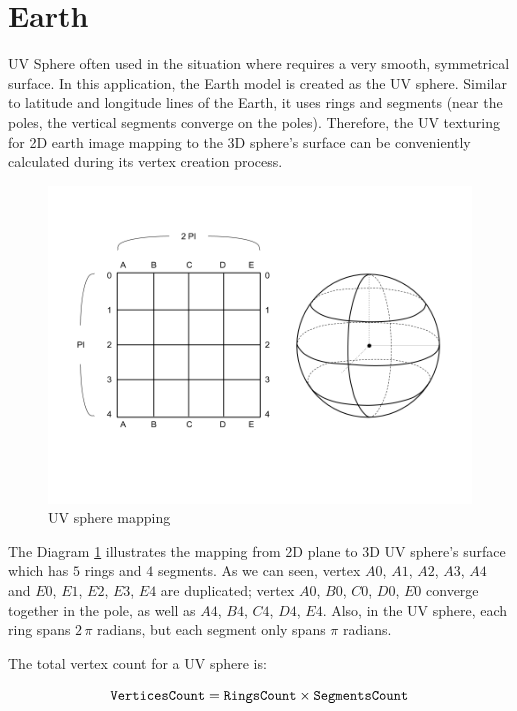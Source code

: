 \section{Earth}

UV Sphere often used in the situation where requires a very smooth, symmetrical surface. In this application, the Earth model is created as the UV sphere. Similar to latitude and longitude lines of the Earth, it uses rings and segments (near the poles, the vertical segments converge on the poles). Therefore, the UV texturing for 2D earth image mapping to the 3D sphere's surface can be conveniently calculated during its vertex creation process.

\begin{figure}[H]
\caption{UV sphere mapping}
\label{fig:uv-sphere-mapping}
\centering
\includegraphics[width=\textwidth, keepaspectratio]{Figures/uv-sphere-mapping.png}
\decoRule
\end{figure}

The Diagram \ref{fig:uv-sphere-mapping} illustrates the mapping from 2D plane to 3D UV sphere's surface which has $5$ rings and $4$ segments. As we can seen, vertex $A0$, $A1$, $A2$, $A3$, $A4$ and $E0$, $E1$, $E2$, $E3$, $E4$ are duplicated; vertex $A0$, $B0$, $C0$, $D0$, $E0$ converge together in the pole, as well as $A4$, $B4$, $C4$, $D4$, $E4$. Also, in the UV sphere, each ring spans $2\,\pi$ radians, but each segment only spans $\pi$ radians.

The total vertex count for a UV sphere is:

\begin{equation}
\label{equ:uv-sphere-vertices}
\texttt{VerticesCount} = \texttt{RingsCount} \times \texttt{SegmentsCount}
\end{equation}

